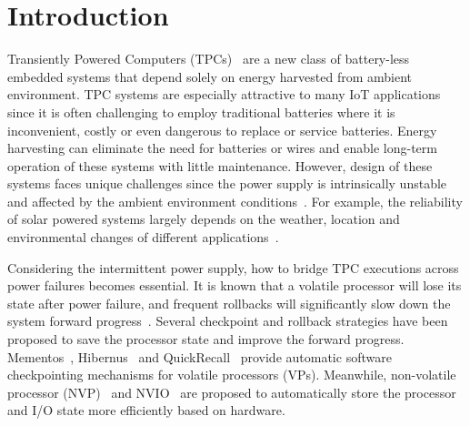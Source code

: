 \section{Introduction} \label{sec:introduction}
Transiently Powered Computers (TPCs)~\cite{Ma2015Architecture, ransford2013transiently, ransford2012mementos} are a new class of battery-less embedded systems that depend solely on energy harvested from ambient environment.
TPC systems are especially attractive to many IoT applications since it is often challenging to employ traditional batteries where it is inconvenient, costly or even dangerous to replace or service batteries. 
Energy harvesting can eliminate the need for batteries or wires and enable long-term operation of these systems with little maintenance.
However, design of these systems faces unique challenges since the power supply is intrinsically unstable and affected by the ambient environment conditions~\cite{Ma2015Architecture, ransford2013transiently,wang2014mppt}.
For example, the reliability of solar powered systems largely depends on the weather, location and environmental changes of different applications~\cite{Abas2015Solar, Alippi2011A, Malaver2014Development, Rojas2015Design}.

Considering the intermittent power supply, how to bridge TPC executions across power failures becomes essential. 
It is known that a volatile processor will lose its state after power failure, and frequent rollbacks will significantly slow down the system forward progress~\cite{Ma2015Architecture}. 
Several checkpoint and rollback strategies have been proposed to save the processor state and improve the forward progress.
Mementos~\cite{ransford2012mementos}, Hibernus~\cite{balsamo2015hibernus} and QuickRecall~\cite{jayakumar2014quickrecall} provide automatic software checkpointing mechanisms for volatile processors (VPs).
Meanwhile, non-volatile processor (NVP)~\cite{wang20123us} and NVIO~\cite{li2016hw} are proposed to automatically store the processor and I/O state more efficiently based on hardware.


